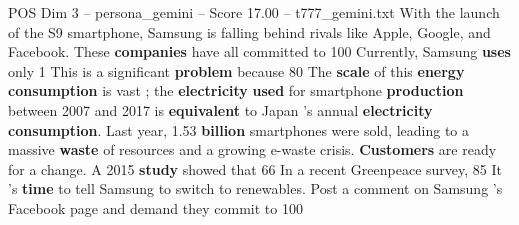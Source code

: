 \begin{textsample}{POS Dim 3 – persona\_gemini – Score 17.00 – t777\_gemini.txt}  \label{ex:f3_pos_050}
With the launch of the S9 smartphone, Samsung is falling behind rivals like Apple, Google, and Facebook.
These \textbf{companies} have all committed to 100 %
Currently, Samsung \textbf{uses} only 1 %
This is a significant \textbf{problem} because 80 %
The \textbf{scale} of this \textbf{energy} \textbf{consumption} is vast ; the \textbf{electricity} \textbf{used} for smartphone \textbf{production} between 2007 and 2017 is \textbf{equivalent} to Japan 's annual \textbf{electricity} \textbf{consumption}.
Last year, 1.53 \textbf{billion} smartphones were sold, leading to a massive \textbf{waste} of resources and a growing e-waste crisis. \textbf{Customers} are ready for a change.
A 2015 \textbf{study} showed that 66 %
In a recent Greenpeace survey, 85 %
It 's \textbf{time} to tell Samsung to switch to renewables.
Post a comment on Samsung ’s Facebook page and demand they commit to 100 %

\end{textsample}

